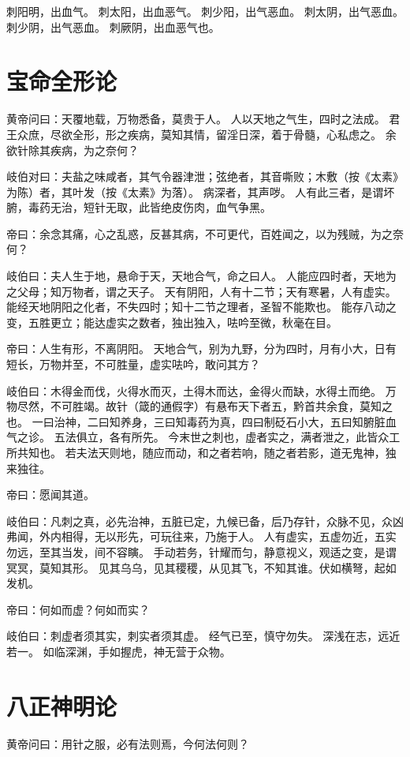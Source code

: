 \documentclass{article}%
\begin{document}
刺阳明，出血气。
刺太阳，出血恶气。
刺少阳，出气恶血。
刺太阴，出气恶血。
刺少阴，出气恶血。
刺厥阴，出血恶气也。


\section{宝命全形论}
黄帝问曰：天覆地载，万物悉备，莫贵于人。
人以天地之气生，四时之法成。
君王众庶，尽欲全形，形之疾病，莫知其情，留淫日深，着于骨髓，心私虑之。
余欲针除其疾病，为之奈何？

岐伯对曰：夫盐之味咸者，其气令器津泄；弦绝者，其音嘶败；木敷（按《太素》为陈）者，其叶发（按《太素》为落）。
病深者，其声哕。
人有此三者，是谓坏腑，毒药无治，短针无取，此皆绝皮伤肉，血气争黑。

帝曰：余念其痛，心之乱惑，反甚其病，不可更代，百姓闻之，以为残贼，为之奈何？

岐伯曰：夫人生于地，悬命于天，天地合气，命之曰人。
人能应四时者，天地为之父母；知万物者，谓之天子。
天有阴阳，人有十二节；天有寒暑，人有虚实。
能经天地阴阳之化者，不失四时；知十二节之理者，圣智不能欺也。
能存八动之变，五胜更立；能达虚实之数者，独出独入，呿吟至微，秋毫在目。

帝曰：人生有形，不离阴阳。
天地合气，别为九野，分为四时，月有小大，日有短长，万物并至，不可胜量，虚实呿吟，敢问其方？

岐伯曰：木得金而伐，火得水而灭，土得木而达，金得火而缺，水得土而绝。
万物尽然，不可胜竭。故针（箴的通假字）有悬布天下者五，黔首共余食，莫知之也。
一曰治神，二曰知养身，三曰知毒药为真，四曰制砭石小大，五曰知腑脏血气之诊。
五法俱立，各有所先。
今末世之刺也，虚者实之，满者泄之，此皆众工所共知也。
若夫法天则地，随应而动，和之者若响，随之者若影，道无鬼神，独来独往。

帝曰：愿闻其道。

岐伯曰：凡刺之真，必先治神，五脏已定，九候已备，后乃存针，众脉不见，众凶弗闻，外内相得，无以形先，可玩往来，乃施于人。
人有虚实，五虚勿近，五实勿远，至其当发，间不容瞚。
手动若务，针耀而匀，静意视义，观适之变，是谓冥冥，莫知其形。
见其乌乌，见其稷稷，从见其飞，不知其谁。伏如横弩，起如发机。

帝曰：何如而虚？何如而实？

岐伯曰：刺虚者须其实，刺实者须其虚。
经气已至，慎守勿失。
深浅在志，远近若一。
如临深渊，手如握虎，神无营于众物。


\section{八正神明论}
黄帝问曰：用针之服，必有法则焉，今何法何则？
\end{document}
